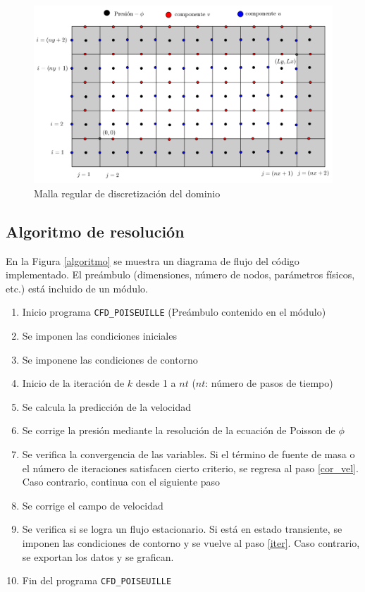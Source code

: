 \begin{center}
\begin{figure}
\includegraphics[width=1\textwidth]{malla.png}
\caption{Malla regular de discretización del dominio} \label{malla}
\end{figure}
\end{center}

\subsection{Algoritmo de resolución}

En la Figura \ref{algoritmo} se muestra un diagrama de flujo del código implementado. El preámbulo (dimensiones, número de nodos, parámetros físicos, etc.) está incluido de un módulo. 

\begin{enumerate}
\item Inicio programa \texttt{CFD\_POISEUILLE} (Preámbulo contenido en el módulo)
\item Se imponen las condiciones iniciales
\item Se imponene las condiciones de contorno
\item \label{iter} Inicio de la iteración de $k$ desde 1 a $nt$ ($nt$: número de pasos de tiempo)
\item \label{cor_vel} Se calcula la predicción de la velocidad
\item Se corrige la presión mediante la resolución de la ecuación de Poisson de $\phi$
\item Se verifica la convergencia de las variables. Si el término de fuente de masa o el número de iteraciones satisfacen cierto criterio, se regresa al paso \ref{cor_vel}. Caso contrario, continua con el siguiente paso
\item Se corrige el campo de velocidad
\item Se verifica si se logra un flujo estacionario. Si está en estado transiente, se imponen las condiciones de contorno y se vuelve al paso \ref{iter}. Caso contrario, se exportan los datos y se grafican.
\item Fin del programa \texttt{CFD\_POISEUILLE}
\end{enumerate}

